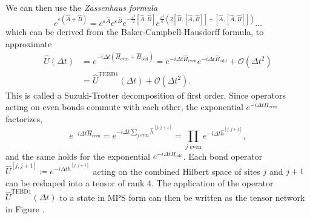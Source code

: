 We can then use the \textit{Zassenhaus formula}
\begin{equation}
	e^{\varepsilon(\hat{A}+\hat{B})} = e^{\varepsilon \hat{A}} e^{\varepsilon \hat{B}} e^{-\frac{\varepsilon^2}{2}[\hat{A}, \hat{B}]} e^{\frac{\varepsilon^3}{6}\left(2[\hat{B},[\hat{A},\hat{B}]]+[\hat{A},[\hat{A},\hat{B}]]\right)} \dots
\end{equation}
which can be derived from the Baker-Campbell-Hausdorff formula, to approximate
\begin{equation}
	\label{eq:mps_first_order_tebd}
	\begin{split}
		\hat{U}(\Delta t) &= e^{-i\Delta t\left(\hat{H}_\text{even} + \hat{H}_\text{odd}\right)} = e^{-i\Delta t\hat{H}_\text{even}}e^{-i\Delta t\hat{H}_\text{odd}} + \mathcal{O}\left(\Delta t^2\right) \\
		&= \hat{U}^\text{TEBD1}(\Delta t) + \mathcal{O}\left(\Delta t^2\right).
	\end{split}
\end{equation}
This is called a Suzuki-Trotter decomposition of first order. Since operators acting on even bonds commute with each other, the exponential $e^{-i\Delta tH_\text{even}}$ factorizes,
\begin{equation}
	e^{-i\Delta t\hat{H}_\text{even}} = e^{-i\Delta t\sum_{j \text{ even}} \hat{h}^{[j, j+1]}} = \prod_{j \text{ even}} e^{-i\Delta t \hat{h}^{[j, j+1]}},
\end{equation}
and the same holds for the exponential $e^{-i\Delta t\hat{H}_\text{odd}}$. Each bond operator $\hat{U}^{[j, j+1]} \coloneqq e^{-i\Delta t \hat{h}^{[j, j+1]}}$ acting on the combined Hilbert space of sites $j$ and $j+1$ can be reshaped into a tensor of rank 4. The application of the operator $\hat{U}^\text{TEBD1}(\Delta t)$ to a state in MPS form can then be written as the tensor network in Figure .
